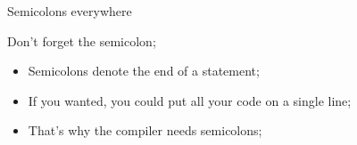 \begin{frame}{Semicolons everywhere}
    \begin{block}{Don't forget the semicolon\alert{;}}
        \begin{itemize}
            \item Semicolons denote the end of a statement\alert{;}
            \item If you wanted, you could put all your code on a single line\alert{;}
            \item That's why the compiler needs semicolons\alert{;}
        \end{itemize}
    \end{block}
\end{frame}



